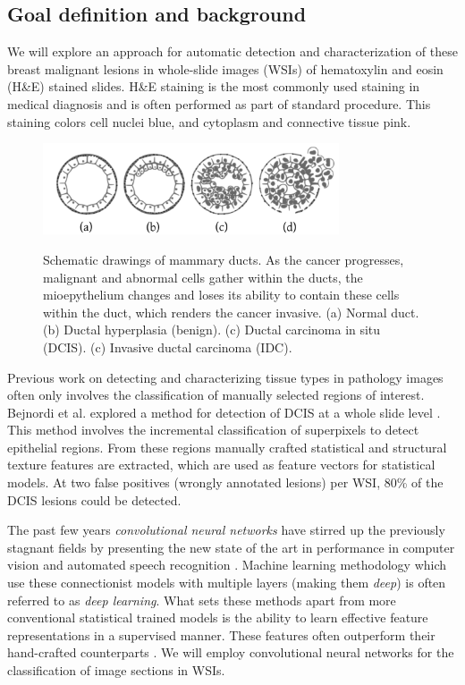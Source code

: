 \documentclass[journal]{IEEEtran}
\begin{document}

\subsection{Goal definition and background}

We will explore an approach for automatic detection and characterization of these breast malignant lesions in whole-slide images (WSIs) of hematoxylin and eosin (H\&E) stained slides. H\&E staining is the most commonly used staining in medical diagnosis and is often performed as part of standard procedure. This staining colors cell nuclei blue, and cytoplasm and connective tissue pink.

\begin{figure}[!t]
\centering{}
\includegraphics[width=3.45in]{lesinos_diagrams.png}
\vspace{-0.38cm}\caption{Schematic drawings of mammary ducts. As the cancer progresses, malignant and abnormal cells gather within the ducts, the mioepythelium changes and loses its ability to contain these cells within the duct, which renders the cancer invasive. (a) Normal duct. (b) Ductal hyperplasia (benign). (c) Ductal carcinoma in situ (DCIS). (c) Invasive ductal carcinoma (IDC). }{}
\label{fig_diagrams}
\end{figure}

Previous work on detecting and characterizing tissue types in pathology images often only involves the classification of manually selected regions of interest. Bejnordi et al. explored a method for detection of DCIS at a whole slide level \cite{bejnordi2016automated}. This method involves the incremental classification of superpixels to detect epithelial regions. From these regions manually crafted statistical and structural texture features are extracted, which are used as feature vectors for statistical models. At two false positives (wrongly annotated lesions) per WSI, 80\% of the DCIS lesions could be detected.

The past few years \emph{convolutional neural networks} have stirred up the previously stagnant fields by presenting the new state of the art in performance in computer vision and automated speech recognition \cite{guodeep,abdelspeech}. Machine learning methodology which use these connectionist models with multiple layers (making them \emph{deep}) is often referred to as \emph{deep learning}. What sets these methods apart from more conventional statistical trained models is the ability to learn effective feature representations in a supervised manner. These features often outperform their hand-crafted counterparts \cite{dlbook}. We will employ convolutional neural networks for the classification of image sections in WSIs.
\end{document}
